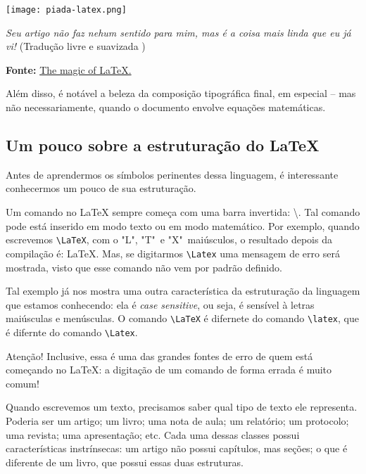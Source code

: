 \begin{marginfigure}
  \texttt{[image: piada-latex.png]}
  
  {
    \sffamily
    \textit{Seu artigo não faz nehum sentido para 
    mim, mas é a coisa mais linda que eu já vi!}
    (Tradução livre e suavizada )
  }
  
  {\textsf{\textbf{Fonte:}} \href{http://nvisnjic.com/2015/01/13/mathjax-magic.html}{The magic of LaTeX.}}
\end{marginfigure}

Além disso, é notável a beleza da composição tipográfica final, em especial -- mas
não necessariamente, quando o documento envolve equações matemáticas.

\subsection{Um pouco sobre a estruturação do LaTeX} %

Antes de aprendermos os símbolos perinentes dessa linguagem, é interessante 
conhecermos um pouco de sua estruturação.

Um comando no \LaTeX{} sempre começa com uma barra invertida: \textbackslash.
Tal comando pode está inserido em \textsf{modo texto} ou em \textsf{modo matemático}.
Por exemplo, quando escrevemos \verb|\LaTeX|, com o "L", "T"\, e "X"\, maiúsculos, 
o resultado depois da compilação é: \LaTeX.
Mas, se digitarmos \verb|\Latex| uma mensagem de erro será mostrada, visto que 
esse comando não vem por padrão definido.

Tal exemplo já nos mostra uma outra característica da estruturação da linguagem 
que estamos conhecendo: ela é \textit{case sensitive}, ou seja, é sensível à
letras maiúsculas e menúsculas.
O comando \verb|\LaTeX| é difernete do comando \verb|\latex|, que é difernte do
comando \verb|\Latex|.

\begin{atencao}{Atenção!}{\exclamacao}
  Inclusive, essa é uma das grandes fontes de erro de quem está começando no 
  \LaTeX: a digitação de um comando de forma errada é muito comum!
\end{atencao}

Quando escrevemos um texto, precisamos saber qual tipo de texto ele representa.
Poderia ser um artigo; um livro; uma nota de aula; um relatório; um protocolo;
uma revista; uma apresentação; etc.
Cada uma dessas \textsf{classes} possui características instrínsecas: um artigo 
não possui capítulos, mas seções; o que é diferente de um livro, que possui 
essas duas estruturas.



